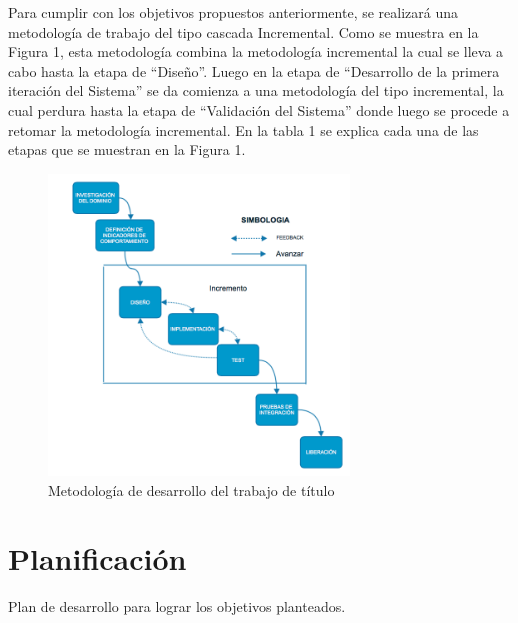 \documentclass[12pt,letterpaper]{article}
\begin{document}
Para cumplir con los objetivos propuestos anteriormente, se realizará una metodología de trabajo del tipo cascada Incremental. 
Como se muestra en la Figura 1, esta metodología combina la metodología incremental la cual se lleva a cabo hasta la etapa de “Diseño”. Luego en la etapa de “Desarrollo de la primera iteración del Sistema” se da comienza a una metodología del tipo incremental, la cual perdura hasta la etapa de “Validación del Sistema” donde luego se procede a retomar la metodología incremental.
En la tabla 1 se explica cada una de las etapas que se muestran en la Figura 1.




\begin{figure}[htb]
\begin{center}
\includegraphics[width=8cm]{metodologia.png}
\end{center}
\caption{Metodolog\'ia de desarrollo del trabajo de t\'itulo}
\end{figure}



\newpage
\clearpage

\section{Planificaci\'on}
\label{plan}

Plan de desarrollo para lograr los objetivos planteados.

\end{document}
